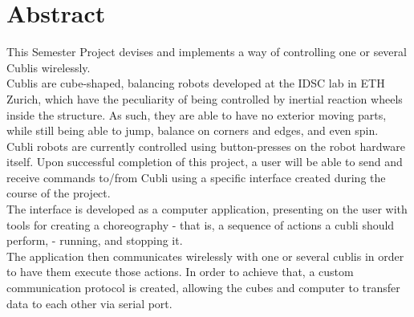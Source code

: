 




 \setcounter{tocdepth}{2}
 \tableofcontents

 \cleardoublepage


\chapter*{Abstract}

This Semester Project devises and implements a way of controlling one or several Cublis wirelessly.\\ 

Cublis are cube-shaped, balancing robots developed at the IDSC lab in ETH Zurich, which have the peculiarity of being controlled by inertial reaction wheels inside the structure. As such, they are able to have no exterior moving parts, while still being able to jump, balance on corners and edges, and even spin.\\ 

Cubli robots are currently controlled using button-presses on the robot hardware itself. Upon successful completion of this project, a user will be able to send and receive commands to/from Cubli using a specific interface created during the course of the project.\\

The interface is developed as a computer application, presenting on the user with tools for creating a choreography - that is, a sequence of actions a cubli should perform, - running, and stopping it.\\ 

The application then communicates wirelessly with one or several cublis in order to have them execute those actions. In order to achieve that, a custom communication protocol is created, allowing the cubes and computer to transfer data to each other via serial port.\\ 

